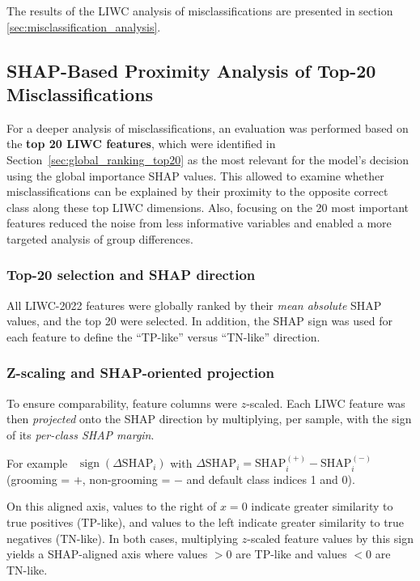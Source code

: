The results of the LIWC analysis of misclassifications are presented in section \ref{sec:misclassification_analysis}.

\subsection{SHAP-Based Proximity Analysis of Top-20 Misclassifications}

For a deeper analysis of misclassifications, an evaluation was performed based on the \textbf{top 20 LIWC features}, which were identified in Section~\ref{sec:global_ranking_top20} as the most relevant for the model's decision using the global importance SHAP values. This allowed to examine whether misclassifications can be explained by their proximity to the opposite correct class along these top LIWC dimensions. Also, focusing on the 20 most important features reduced the noise from less informative variables and enabled a more targeted analysis of group differences.

\subsubsection{Top-20 selection and SHAP direction}

All LIWC-2022 features were globally ranked by their \emph{mean absolute} SHAP values, and the top 20 were selected. In addition, the SHAP sign was used for each feature to define the “TP-like” versus “TN-like” direction.

\subsubsection{Z-scaling and SHAP-oriented projection}

To ensure comparability, feature columns were $z$-scaled. Each LIWC feature was then \emph{projected} onto the SHAP direction by multiplying, per sample, with the sign of its \emph{per-class SHAP margin}.  

For example \ $\operatorname{sign}(\Delta\mathrm{SHAP}_i)$ with
$\Delta\mathrm{SHAP}_i = \mathrm{SHAP}^{(+)}_i - \mathrm{SHAP}^{(-)}_i$ (grooming = $+$, non-grooming = $-$ and default class indices 1 and 0). 

On this aligned axis, values to the right of $x=0$ indicate greater similarity to true positives (TP-like), and values to the left indicate greater similarity to true negatives (TN-like). In both cases, multiplying $z$-scaled feature values by this sign yields a SHAP-aligned axis where values $>0$ are TP-like and values $<0$ are TN-like.

